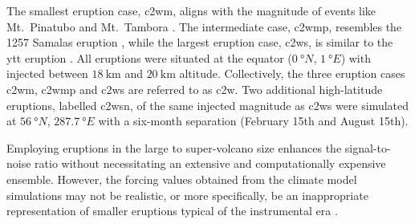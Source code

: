 \documentclass{ametsocV6.1}
\newcommand{\iso}[1][i]{{#1}njected \ce{SO2}}
\begin{document}
The smallest eruption case, \gls{c2wm}, aligns with the magnitude of events like Mt.\
Pinatubo \citep[\(\sim10\)--\(\SI{20}{\tera\gram(\ce{SO2})}\);][]{timmreck2018} and Mt.\
Tambora \citep[\(\sim\SI{56.2}{\tera\gram(\ce{SO2})}\);][]{zanchettin2016}. The
intermediate case, \gls{c2wmp}, resembles the 1257 Samalas eruption
\citep[\(\sim{118.8}\)--\(\SI{173.1}{\tera\gram(\ce{SO2})}\);][]{toohey2017,ottobliesner2016},
while the largest eruption case, \gls{c2ws}, is similar to the \gls{ytt} eruption
\citep[\(100\)--\(\SI{10000}{\tera\gram()}\);][]{jones2005}. All eruptions were
situated at the equator (\(\SI{0}{\degree N}\), \(\SI{1}{\degree E}\)) with \ce{SO2}
injected between \(\SI{18}{\kilo\meter}\) and \(\SI{20}{\kilo\meter}\) altitude.
Collectively, the three eruption cases \gls{c2wm}, \gls{c2wmp} and \gls{c2ws} are
referred to as \gls{c2w}. Two additional high-latitude eruptions, labelled \gls{c2wsn},
of the same \iso{} magnitude as \gls{c2ws} were simulated at \(\SI{56}{\degree N}\),
\(\SI{287.7}{\degree E}\) with a six-month separation (February 15th and August 15th).

Employing eruptions in the large to super-volcano size enhances the signal-to-noise
ratio without necessitating an extensive and computationally expensive ensemble.
However, the forcing values obtained from the climate model simulations may not be
realistic, or more specifically, be an inappropriate representation of smaller eruptions
typical of the instrumental era \citep{gregory2016}.
\end{document}
